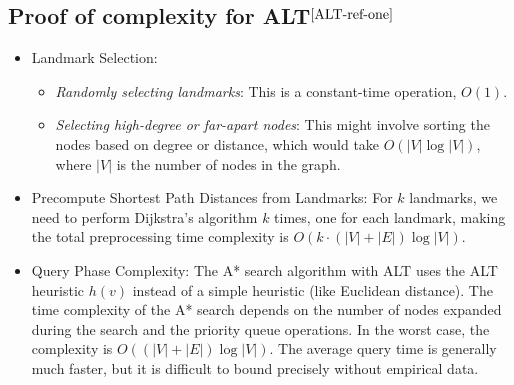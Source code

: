 \begin{appendices}
\section{Proof of complexity for ALT$^{\cite{ALT-ref-one}}$}\label{appendix:ALT:complexity}
	\begin{itemize}
		\item Landmark Selection:
			\begin{itemize}
				\item \textit{Randomly selecting landmarks}: This is a constant-time operation, $ O(1) $.
				\item \textit{Selecting high-degree or far-apart nodes}: This might involve sorting the nodes based on degree or distance, which would take $ O(|V| \log |V|) $, where $ |V| $ is the number of nodes in the graph.
			\end{itemize}
		\item Precompute Shortest Path Distances from Landmarks: For $k$ landmarks, we need to perform Dijkstra’s algorithm $k$ times, one for each landmark, making the total preprocessing time complexity is $O(k \cdot (|V| + |E|) \log |V|)$.
		\item Query Phase Complexity: The A* search algorithm with ALT uses the ALT heuristic $ h(v) $ instead of a simple heuristic (like Euclidean distance). The time complexity of the A* search depends on the number of nodes expanded during the search and the priority queue operations. In the worst case, the complexity is $ O((|V| + |E|) \log |V|) $. The average query time is generally much faster, but it is difficult to bound precisely without empirical data.		
	\end{itemize}


\end{appendices}
